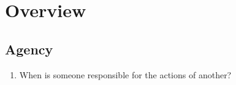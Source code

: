 \section{Overview}

\subsection{Agency}

\begin{enumerate}
    \item When is someone responsible for the actions of another?
\end{enumerate}

